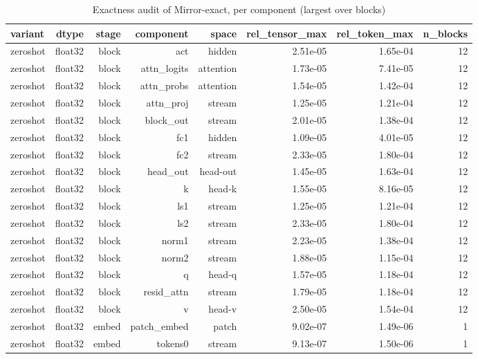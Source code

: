 \begin{table}[t]
\centering
\small
\caption{Exactness audit of Mirror-exact, per component (largest over blocks)}
\label{tab:appendix_a1_exactness}
\begin{tabular}{lrrrrrrr}
\toprule
variant & dtype & stage & component & space & rel\_tensor\_max & rel\_token\_max & n\_blocks \\
\midrule
zeroshot & float32 & block & act & hidden & 2.51e-05 & 1.65e-04 & 12 \\
zeroshot & float32 & block & attn\_logits & attention & 1.73e-05 & 7.41e-05 & 12 \\
zeroshot & float32 & block & attn\_probs & attention & 1.54e-05 & 1.42e-04 & 12 \\
zeroshot & float32 & block & attn\_proj & stream & 1.25e-05 & 1.21e-04 & 12 \\
zeroshot & float32 & block & block\_out & stream & 2.01e-05 & 1.38e-04 & 12 \\
zeroshot & float32 & block & fc1 & hidden & 1.09e-05 & 4.01e-05 & 12 \\
zeroshot & float32 & block & fc2 & stream & 2.33e-05 & 1.80e-04 & 12 \\
zeroshot & float32 & block & head\_out & head-out & 1.45e-05 & 1.63e-04 & 12 \\
zeroshot & float32 & block & k & head-k & 1.55e-05 & 8.16e-05 & 12 \\
zeroshot & float32 & block & ls1 & stream & 1.25e-05 & 1.21e-04 & 12 \\
zeroshot & float32 & block & ls2 & stream & 2.33e-05 & 1.80e-04 & 12 \\
zeroshot & float32 & block & norm1 & stream & 2.23e-05 & 1.38e-04 & 12 \\
zeroshot & float32 & block & norm2 & stream & 1.88e-05 & 1.15e-04 & 12 \\
zeroshot & float32 & block & q & head-q & 1.57e-05 & 1.18e-04 & 12 \\
zeroshot & float32 & block & resid\_attn & stream & 1.79e-05 & 1.18e-04 & 12 \\
zeroshot & float32 & block & v & head-v & 2.50e-05 & 1.54e-04 & 12 \\
zeroshot & float32 & embed & patch\_embed & patch & 9.02e-07 & 1.49e-06 & 1 \\
zeroshot & float32 & embed & tokens0 & stream & 9.13e-07 & 1.50e-06 & 1 \\

\end{tabular}
\end{table}

